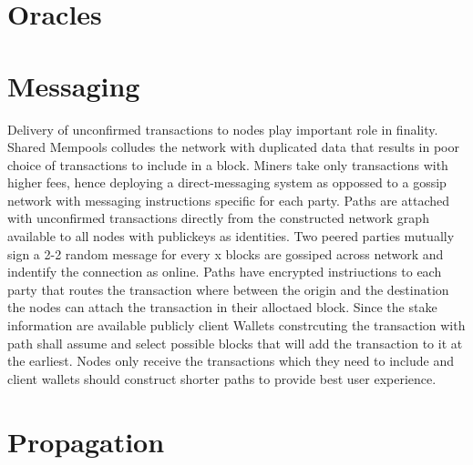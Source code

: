 \documentclass[a4paper,10pt]{article}
\begin{document}
\section{Oracles}

\section{Messaging}
Delivery of unconfirmed transactions to nodes play important role in finality. Shared Mempools colludes the network with duplicated data that results in poor choice of transactions to include in a block. Miners take only transactions with higher fees, hence deploying a direct-messaging system as oppossed to a gossip network with messaging instructions specific for each party. Paths are attached with unconfirmed transactions directly from the constructed network graph available to all nodes with publickeys as identities. Two peered parties mutually sign a 2-2 random message for every x blocks are gossiped across network and indentify the connection as online. Paths have encrypted instriuctions to each party that routes the transaction where between the origin and the destination the nodes can attach the transaction in their alloctaed block. Since the stake information are available publicly client Wallets constrcuting the transaction with path shall assume and select possible blocks that will add the transaction to it at the earliest. Nodes only receive the transactions which they need to include and client wallets should construct shorter paths to provide best user experience.

\section{Propagation}
\end{document}
